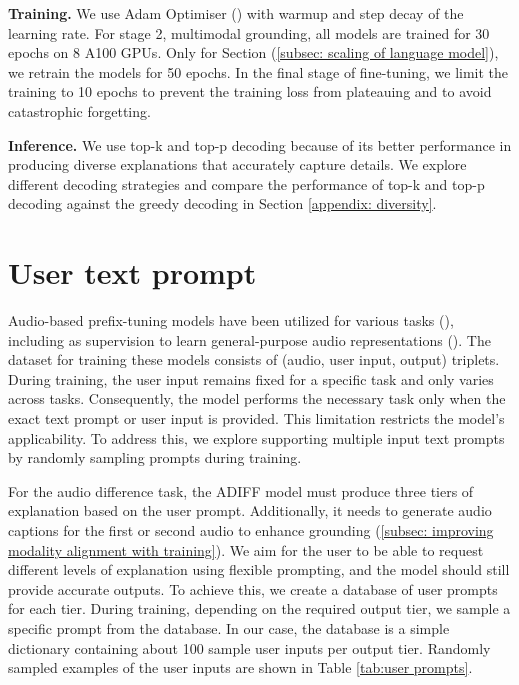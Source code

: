 \textbf{Training.}  We use Adam Optimiser (\cite{adam}) with warmup and step decay of the learning rate. For stage 2, multimodal grounding, all models are trained for 30 epochs on 8 A100 GPUs. Only for Section (\ref{subsec: scaling of language model}), we retrain the models for 50 epochs. In the final stage of fine-tuning, we limit the training to 10 epochs to prevent the training loss from plateauing and to avoid catastrophic forgetting.

\textbf{Inference.} We use top-k and top-p decoding because of its better performance in producing diverse explanations that accurately capture details. We explore different decoding strategies and compare the performance of top-k and top-p decoding against the greedy decoding in Section \ref{appendix: diversity}.

\section{User text prompt} \vspace{-0.1in}
Audio-based prefix-tuning models have been utilized for various tasks (\cite{noaudiocap,selm}), including as supervision to learn general-purpose audio representations (\cite{mspengi}). The dataset for training these models consists of (audio, user input, output) triplets. During training, the user input remains fixed for a specific task and only varies across tasks. Consequently, the model performs the necessary task only when the exact text prompt or user input is provided. This limitation restricts the model’s applicability. To address this, we explore supporting multiple input text prompts by randomly sampling prompts during training.

For the audio difference task, the ADIFF model must produce three tiers of explanation based on the user prompt. Additionally, it needs to generate audio captions for the first or second audio to enhance grounding (\ref{subsec: improving modality alignment with training}). We aim for the user to be able to request different levels of explanation using flexible prompting, and the model should still provide accurate outputs. To achieve this, we create a database of user prompts for each tier. During training, depending on the required output tier, we sample a specific prompt from the database. In our case, the database is a simple dictionary containing about 100 sample user inputs per output tier. Randomly sampled examples of the user inputs are shown in Table \ref{tab:user prompts}.

